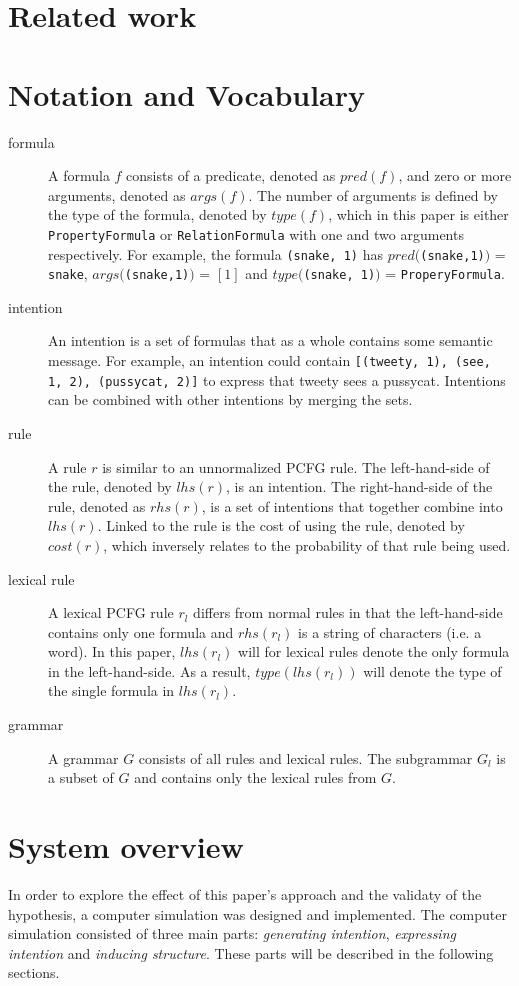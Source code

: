\documentclass[a4paper]{article}
\begin{document}
\section{Related work}
\section{Notation and Vocabulary}
\begin{description}
    \item[formula] A formula $f$ consists of a predicate, denoted as $pred(f)$, and zero or more arguments, denoted as $args(f)$. The number of arguments is defined by the type of the formula, denoted by $type(f)$, which in this paper is either \verb|PropertyFormula| or \verb|RelationFormula| with one and two arguments respectively. For example, the formula \verb|(snake, 1)| has $pred($\verb|(snake,1)|$)$ = \verb|snake|, $args($\verb|(snake,1)|$)$ = $[1]$ and $type($\verb|(snake, 1)|$)$ = \verb|ProperyFormula|.
    \item[intention] An intention is a set of formulas that as a whole contains some semantic message. For example, an intention could contain \verb|[(tweety, 1), (see, 1, 2), (pussycat, 2)]| to express that tweety sees a pussycat. Intentions can be combined with other intentions by merging the sets.
    \item[rule] A rule $r$ is similar to an unnormalized PCFG rule. The left-hand-side of the rule, denoted by $lhs(r)$, is an intention. The right-hand-side of the rule, denoted as $rhs(r)$, is a set of intentions that together combine into $lhs(r)$. Linked to the rule is the cost of using the rule, denoted by $cost(r)$, which inversely relates to the probability of that rule being used.
    \item[lexical rule] A lexical PCFG rule $r_l$ differs from normal rules in that the left-hand-side contains only one formula and $rhs(r_l)$ is a string of characters (i.e. a word). In this paper, $lhs(r_l)$ will for lexical rules denote the only formula in the left-hand-side. As a result, $type(lhs(r_l))$ will denote the type of the single formula in $lhs(r_l)$.
    \item[grammar] A grammar $G$ consists of all rules and lexical rules. The subgrammar $G_l$ is a subset of $G$ and contains only the lexical rules from $G$.
\end{description}
\section{System overview}
\label{sec:system_overview}
In order to explore the effect of this paper's approach and the validaty of the hypothesis, a computer simulation was designed and implemented. The computer simulation consisted of three main parts: \emph{generating intention}, \emph{expressing intention} and \emph{inducing structure}. These parts will be described in the following sections.
\end{document}
